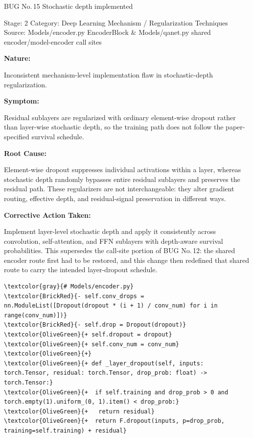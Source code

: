 \documentclass[10pt]{article}
\newcommand{\FieldLabel}[1]{%
 {\bfseries #1:}\par
}
\begin{document}
\begin{bugbox}{BUG No.\,15 \quad Stochastic depth implemented}
{\color{MetaGray}\small Stage: 2 \;\textbar\; Category: Deep Learning Mechanism / Regularization Techniques \;\textbar\; Source: Models/encoder.py EncoderBlock \& Models/qanet.py shared encoder/model-encoder call sites\par}
\vspace{0.22em}
\FieldLabel{Nature}
Inconsistent mechanism-level implementation flaw in stochastic-depth regularization.
\par
\vspace{0.35em}
\FieldLabel{Symptom}
Residual sublayers are regularized with ordinary element-wise dropout rather than layer-wise stochastic depth, so the training path does not follow the paper-specified survival schedule.
\par
\vspace{0.35em}
\FieldLabel{Root Cause}
Element-wise dropout suppresses individual activations within a layer, whereas stochastic depth randomly bypasses entire residual sublayers and preserves the residual path. These regularizers are not interchangeable: they alter gradient routing, effective depth, and residual-signal preservation in different ways.
\par
\vspace{0.35em}
\FieldLabel{Corrective Action Taken}
Implement layer-level stochastic depth and apply it consistently across convolution, self-attention, and FFN sublayers with depth-aware survival probabilities. This supersedes the call-site portion of BUG No.\,12: the shared encoder route first had to be restored, and this change then redefined that shared route to carry the intended layer-dropout schedule.
\par
\vspace{0.35em}
\begin{Verbatim}[commandchars=\\\{\},fontsize=\footnotesize,breaklines=true,breaksymbol={},frame=leftline,framerule=2pt,rulecolor=\color{gray!40},xleftmargin=6pt,formatcom=\singlespacing]
\textcolor{gray}{# Models/encoder.py}
\textcolor{BrickRed}{- self.conv_drops = nn.ModuleList([Dropout(dropout * (i + 1) / conv_num) for i in range(conv_num)])}
\textcolor{BrickRed}{- self.drop = Dropout(dropout)}
\textcolor{OliveGreen}{+ self.dropout = dropout}
\textcolor{OliveGreen}{+ self.conv_num = conv_num}
\textcolor{OliveGreen}{+}
\textcolor{OliveGreen}{+ def _layer_dropout(self, inputs: torch.Tensor, residual: torch.Tensor, drop_prob: float) -> torch.Tensor:}
\textcolor{OliveGreen}{+  if self.training and drop_prob > 0 and torch.empty(1).uniform_(0, 1).item() < drop_prob:}
\textcolor{OliveGreen}{+   return residual}
\textcolor{OliveGreen}{+  return F.dropout(inputs, p=drop_prob, training=self.training) + residual}
 

\end{Verbatim}
\end{bugbox}
\end{document}
